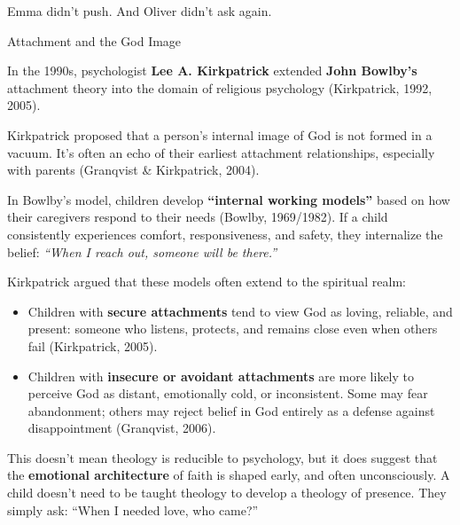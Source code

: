 Emma didn’t push.  
And Oliver didn’t ask again.

\medskip

\begin{PsychologicalSidebar}{Attachment and the God Image}

  In the 1990s, psychologist \textbf{Lee A. Kirkpatrick} extended \textbf{John Bowlby’s} attachment 
  theory into the domain of religious psychology (Kirkpatrick, 1992, 2005).
  
  \medskip
  
  Kirkpatrick proposed that a person’s internal image of God is not formed in a vacuum. It’s often an 
  echo of their earliest attachment relationships, especially with parents (Granqvist \& Kirkpatrick, 2004).
  
  \medskip
  
  In Bowlby’s model, children develop \textbf{“internal working models”} based on how their caregivers 
  respond to their needs (Bowlby, 1969/1982). If a child consistently experiences comfort, responsiveness, 
  and safety, they internalize the belief: \textit{``When I reach out, someone will be there.''}
  
  \medskip
  
  Kirkpatrick argued that these models often extend to the spiritual realm:

  \medskip
  
  \begin{itemize}
    \item Children with \textbf{secure attachments} tend to view God as loving, reliable, and present: 
    someone who listens, protects, and remains close even when others fail (Kirkpatrick, 2005).
    \item Children with \textbf{insecure or avoidant attachments} are more likely to perceive God as 
    distant, emotionally cold, or inconsistent. Some may fear abandonment; others may reject belief in 
    God entirely as a defense against disappointment (Granqvist, 2006).
  \end{itemize}
  
  \medskip
  
  This doesn’t mean theology is reducible to psychology, but it does suggest that the \textbf{emotional 
  architecture} of faith is shaped early, and often unconsciously. A child doesn’t need to be taught 
  theology to develop a theology of presence. They simply ask:  
  ``When I needed love, who came?''
  
  \medskip
  

\end{PsychologicalSidebar}
